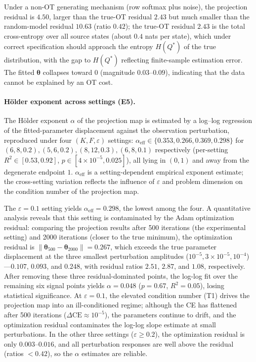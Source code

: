 \documentclass[11pt,a4paper]{article}
\theoremstyle{remark}
\begin{document}
Under a non-OT generating mechanism (row softmax plus noise), the projection residual is
$4.50$, larger than the true-OT residual $2.43$ but much smaller than the random-model
residual $10.63$ (ratio $0.42$); the true-OT residual $2.43$ is the total cross-entropy
over all source states (about $0.4$ nats per state), which under correct specification
should approach the entropy $H(Q^*)$ of the true distribution, with the gap to
$H(Q^*)$ reflecting finite-sample estimation error. The fitted
$\bm{\theta}$ collapses toward $0$ (magnitude $0.03$--$0.09$), indicating that the data
cannot be explained by an OT cost.

\paragraph{H\"older exponent across settings (E5).}
The H\"older exponent $\alpha$ of the projection map is estimated by a log--log regression
of the fitted-parameter displacement against the observation perturbation, reproduced under
four $(K,F,\varepsilon)$ settings: $\alpha_{\mathrm{eff}}\in\{0.353,0.266,0.369,0.298\}$
for $(6,8,0.2),(5,6,0.2),(8,12,0.3),(6,8,0.1)$ respectively (per-setting
$R^2\in[0.53,0.92]$, $p\in[4\times10^{-5},0.025]$), all lying in $(0,1)$ and away from the
degenerate endpoint $1$. $\alpha_{\mathrm{eff}}$ is a setting-dependent empirical exponent
estimate; the cross-setting variation reflects the influence of $\varepsilon$ and problem
dimension on the condition number of the projection map.

The $\varepsilon=0.1$ setting yields $\alpha_{\mathrm{eff}}=0.298$, the lowest among the
four. A quantitative analysis reveals that this setting is contaminated by the Adam
optimization residual: comparing the projection results after 500 iterations (the
experimental setting) and 2000 iterations (closer to the true minimum), the optimization
residual is $\|\bm{\theta}_{500}-\bm{\theta}_{2000}\|=0.267$, which exceeds the true
parameter displacement at the three smallest perturbation amplitudes
($10^{-5},3\times10^{-5},10^{-4}$)---$0.107$, $0.093$, and $0.248$, with residual ratios
$2.51$, $2.87$, and $1.08$, respectively. After removing these three residual-dominated
points, the log-log fit over the remaining six signal points yields $\alpha=0.048$
($p=0.67$, $R^2=0.05$), losing statistical significance. At $\varepsilon=0.1$, the elevated
condition number (T1) drives the projection map into an ill-conditioned regime; although the
CE has flattened after 500 iterations ($\Delta\mathrm{CE}\approx10^{-5}$), the parameters
continue to drift, and the optimization residual contaminates the log-log slope estimate at
small perturbations. In the other three settings ($\varepsilon\ge0.2$), the optimization
residual is only $0.003$--$0.016$, and all perturbation responses are well above the
residual (ratios $<0.42$), so the $\alpha$ estimates are reliable.
\end{document}
